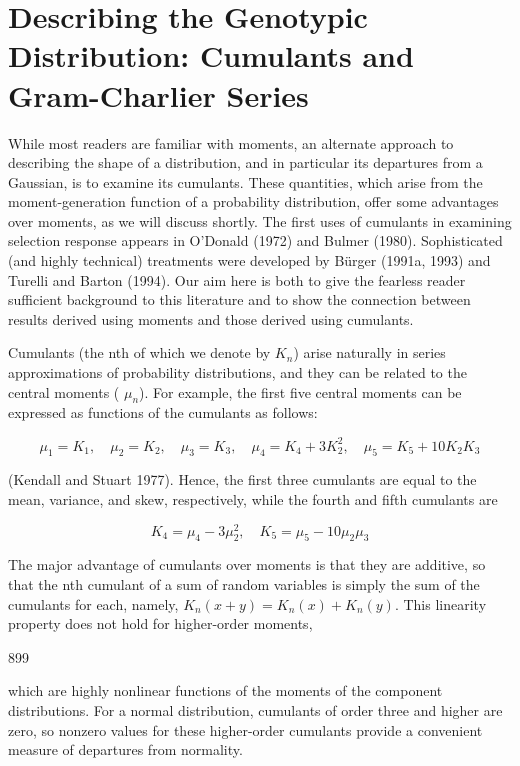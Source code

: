 \documentclass{article}
\begin{document}
\section{Describing the Genotypic Distribution: Cumulants and Gram-Charlier Series}
While most readers are familiar with moments, an alternate approach to describing the shape of a distribution, and in particular its departures from a Gaussian, is to examine its cumulants. These quantities, which arise from the moment-generation function of a probability distribution, offer some advantages over moments, as we will discuss shortly. The first uses of cumulants in examining selection response appears in O'Donald (1972) and Bulmer (1980). Sophisticated (and highly technical) treatments were developed by Bürger (1991a, 1993) and Turelli and Barton (1994). Our aim here is both to give the fearless reader sufficient background to this literature and to show the connection between results derived using moments and those derived using cumulants.

Cumulants (the nth of which we denote by  $ K_n $) arise naturally in series approximations of probability distributions, and they can be related to the central moments ( $ \mu_n $). For example, the first five central moments can be expressed as functions of the cumulants as follows:

\begin{equation}
\mu_{1}=K_{1},\quad\mu_{2}=K_{2},\quad\mu_{3}=K_{3},\quad\mu_{4}=K_{4}+3K_{2}^{2},\quad\mu_{5}=K_{5}+10K_{2}K_{3}
\end{equation}

(Kendall and Stuart 1977). Hence, the first three cumulants are equal to the mean, variance, and skew, respectively, while the fourth and fifth cumulants are

\begin{equation}
K_{4}=\mu_{4}-3\mu_{2}^{2},\quad K_{5}=\mu_{5}-10\mu_{2}\mu_{3}
\tag{24.20}
\label{eq:24_20}
\end{equation}

The major advantage of cumulants over moments is that they are additive, so that the nth cumulant of a sum of random variables is simply the sum of the cumulants for each, namely,  $ K_n(x+y) = K_n(x) + K_n(y) $. This linearity property does not hold for higher-order moments,

899

which are highly nonlinear functions of the moments of the component distributions. For a normal distribution, cumulants of order three and higher are zero, so nonzero values for these higher-order cumulants provide a convenient measure of departures from normality.
\end{document}
